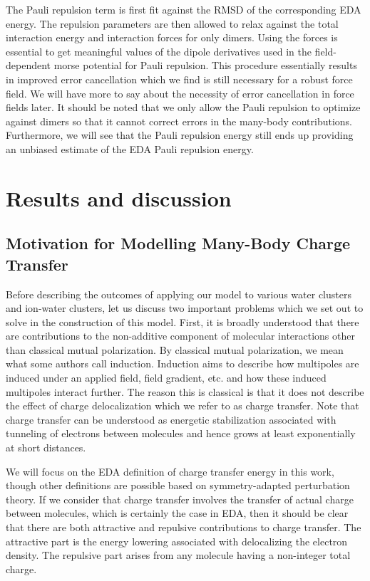 \documentclass[journal=jacsat,manuscript=article]{achemso}
\begin{document}
The Pauli repulsion term is first fit against the RMSD of the corresponding EDA energy. The repulsion parameters are then allowed to relax against the total interaction energy and interaction forces for only dimers. Using the forces is essential to get meaningful values of the dipole derivatives used in the field-dependent morse potential for Pauli repulsion. This procedure essentially results in improved error cancellation which we find is still necessary for a robust force field. We will have more to say about the necessity of error cancellation in force fields later. It should be noted that we only allow the Pauli repulsion to optimize against dimers so that it cannot correct errors in the many-body contributions. Furthermore, we will see that the Pauli repulsion energy still ends up providing an unbiased estimate of the EDA Pauli repulsion energy.

\section*{Results and discussion}
\subsection*{Motivation for Modelling Many-Body Charge Transfer}

Before describing the outcomes of applying our model to various water clusters and ion-water clusters, let us discuss two important problems which we set out to solve in the construction of this model. First, it is broadly understood that there are contributions to the non-additive component of molecular interactions other than classical mutual polarization. By classical mutual polarization, we mean what some authors call induction.\cite{herman2023accurate} Induction aims to describe how multipoles are induced under an applied field, field gradient, etc. and how these induced multipoles interact further. The reason this is classical is that it does not describe the effect of charge delocalization which we refer to as charge transfer. Note that charge transfer can be understood as energetic stabilization associated with tunneling of electrons between molecules and hence grows at least exponentially at short distances.\cite{misquitta2013charge}

We will focus on the EDA definition of charge transfer energy in this work, though other definitions are possible based on symmetry-adapted perturbation theory.\cite{stone2009charge,misquitta2013charge} If we consider that charge transfer involves the transfer of actual charge between molecules, which is certainly the case in EDA\cite{thirman2018characterizing}, then it should be clear that there are both attractive and repulsive contributions to charge transfer. The attractive part is the energy lowering associated with delocalizing the electron density. The repulsive part arises from any molecule having a non-integer total charge.
\end{document}
